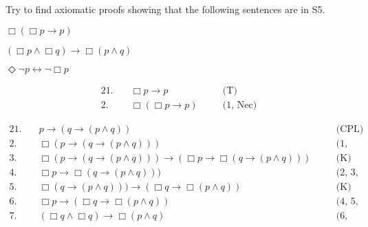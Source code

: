 \begin{exercise}
  Try to find axiomatic proofs showing that the following sentences are in S5.
  \begin{exlist}
    \item $\Box(\Box p \to p)$
    \item $(\Box p \land \Box q) \to \Box(p \land q)$
    \item $\Diamond \neg p \leftrightarrow \neg \Box p$
  \end{exlist}
\end{exercise}
\begin{solution}
  \begin{sollist}
    
    \item 
    \begin{alignat*}{2}
      1.\quad& \Box p \to p &\quad& \text{(T)}\\
      2.\quad& \Box(\Box p \to p) &\quad& \text{(1, Nec)}
    \end{alignat*}
    
    \item 
    \begin{alignat*}{2}
      1.\quad& p \to (q \to (p \land q)) &\quad& \text{(CPL)}\\
      2.\quad& \Box (p \to (q \to (p \land q))) &\quad& \text{(1, Nec)}\\
      3.\quad& \Box (p \to (q \to (p \land q))) \to (\Box p \to \Box (q \to (p \land q))) &\quad& \text{(K)}\\
      4.\quad& \Box p \to \Box (q \to (p \land q))) &\quad& \text{(2, 3, CPL)}\\
      5.\quad& \Box (q \to (p \land q))) \to (\Box q \to \Box (p\land q))  &\quad& \text{(K)}\\
      6.\quad& \Box p \to (\Box q \to \Box (p\land q))  &\quad& \text{(4, 5, CPL)}\\
      7.\quad& (\Box q \land \Box q) \to \Box (p\land q)  &\quad& \text{(6, CPL)}
    \end{alignat*}


\end{sollist}
\end{solution}
